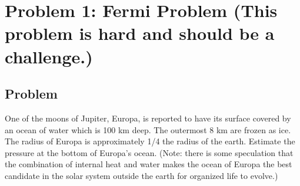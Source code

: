 \documentclass[solutions]{esg8012pset}
\date{September 8}
\begin{document}
\section*{Problem 1: Fermi Problem (This problem is hard and should be a challenge.)}
\subsection*{Problem}
  One of the moons of Jupiter, Europa, is reported to have its surface covered by an ocean of water
  which is 100 km deep.  The outermost 8 km are frozen as ice. The radius of Europa is
  approximately 1/4 the radius of the earth. Estimate the pressure at the bottom of Europa's ocean.
  (Note: there is some speculation that the combination of internal heat and water makes the ocean
  of Europa the best candidate in the solar system outside the earth for organized life to evolve.)
\end{document}
